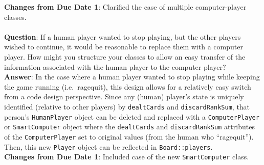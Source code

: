 \documentclass[12pt]{article}
\begin{document}
		{\bf Changes from Due Date 1}: Clarified the case of multiple computer-player classes.
		\\\\
		{\bf Question}: If a human player wanted to stop playing, but the other players wished to continue, it would be reasonable to replace them with a computer player. How might you structure your classes to allow an easy transfer of the information associated with the human player to the computer player?\\
		{\bf Answer}: In the case where a human player wanted to stop playing while keeping the game running (i.e.\ ragequit), this design allows for a relatively easy switch from a code design perspective. Since any (human) player's state is uniquely identified (relative to other players) by {\tt dealtCards} and {\tt discardRankSum}, that person's {\tt HumanPlayer} object can be deleted and replaced with a {\tt ComputerPlayer} or {\tt SmartComputer} object where the {\tt dealtCards} and {\tt discardRankSum} attributes of the {\tt ComputerPlayer} set to original values (from the human who ``ragequit''). Then, this new {\tt Player} object can be reflected in {\tt Board::players}.\\
		{\bf Changes from Due Date 1}: Included case of the new {\tt SmartComputer} class.
\end{document}
